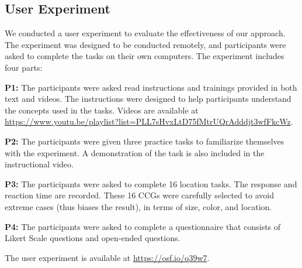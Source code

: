 \subsection{User Experiment}

We conducted a user experiment to evaluate the effectiveness of our approach. The experiment was designed to be conducted remotely, and participants were asked to complete the tasks on their own computers. The experiment includes four parts:

\textbf{P1:} The participants were asked read instructions and trainings provided in both text and videos. The instructions were designed to help participants understand the concepts used in the tasks. Videos are available at \url{https://www.youtu.be/playlist?list=PLL7sHvxLtD75fMtrUQrAdddjt3wfFkcWz}.

\textbf{P2:} The participants were given three practice tasks to familiarize themselves with the experiment. A demonstration of the task is also included in the instructional video.

\textbf{P3:} The participants were asked to complete 16 location tasks. The response and reaction time are recorded. These 16 CCGs were carefully selected to avoid extreme cases (thus biases the result), in terms of size, color, and location.

\textbf{P4:} The participants were asked to complete a questionnaire that consists of Likert Scale questions and open-ended questions.

The user experiment is available at \url{https://osf.io/q39w7}.

\color{black}